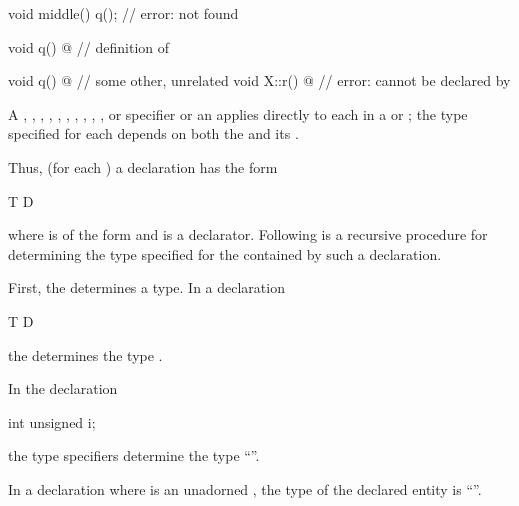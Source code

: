 \begin{itemize}
\begin{example}
\begin{codeblock}
{  void middle() {
    q();                        // error:  not found
  }

  void q() { @\commentellip@ }        // definition of 
}

void q() { @\commentellip@ }          // some other, unrelated 
void X::r() { @\commentellip@ }       // error:  cannot be declared by 
\end{codeblock}
\end{example}
\end{itemize}

\pnum
A
,
,
,
,
,
,
,
,
,
,
or
specifier
or an 
applies directly to each 
in a  or ;
the type specified for each  depends on
both the  and its .

\pnum
Thus, (for each ) a declaration has the form
\begin{codeblock}
T D
\end{codeblock}
where
is of the form 
and
is a declarator.
Following is a recursive procedure for determining
the type specified for the contained
by such a declaration.

\pnum
First, the
determines a type.
In a declaration
\begin{codeblock}
T D
\end{codeblock}
the
determines the type
.
\begin{example}
In the declaration
\begin{codeblock}
int unsigned i;
\end{codeblock}
the type specifiers
determine the type
``''.
\end{example}

\pnum
In a declaration
where
is an unadorned ,
the type of the declared entity is
``''.

